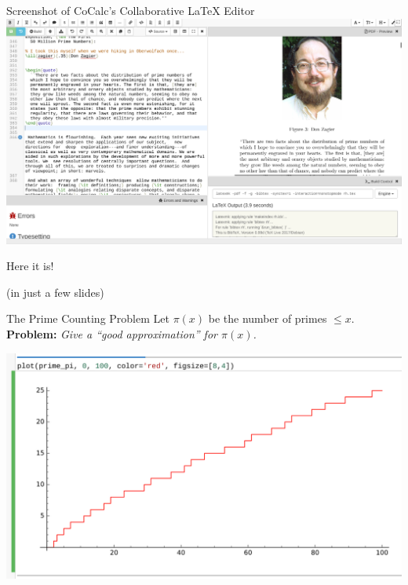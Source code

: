 \documentclass{beamer}
\begin{document}
\begin{frame}{Screenshot of CoCalc's Collaborative \LaTeX{} Editor}
\includegraphics[width=\textwidth]{pics/cocalc-latex}
\end{frame}

\begin{frame}{}
\vfill
\begin{center}
\hrulefill
\vfill
\Huge\sc Here it is!
\vfill
\hrulefill
\end{center}
\vfill
\begin{center}
(in just a few slides)
\end{center}
\end{frame}


\begin{frame}{The Prime Counting Problem}
  Let $\pi(x)$ be the number of primes $\leq x$.\\
  {\bf Problem:} {\em Give a ``good approximation'' for $\pi(x)$.}
  \vfill

  \includegraphics[width=.98\textwidth]{pics/prime-pi-100}

\end{frame}
\end{document}
